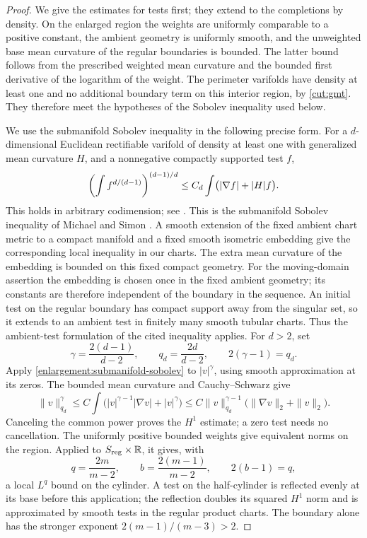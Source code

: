 \begin{proof}
We give the estimates for tests first; they extend to the completions by
density.  On the enlarged region the weights are uniformly comparable
to a positive constant, the ambient geometry is uniformly smooth, and
the unweighted base mean curvature of the regular boundaries is bounded.
The latter bound follows from the prescribed weighted mean curvature
and the bounded first derivative of the logarithm of the weight.
The perimeter varifolds have density at least one and no additional
boundary term on this interior region, by \cref{cut:gmt}.  They therefore
meet the hypotheses of the Sobolev inequality used below.

We use the submanifold Sobolev inequality in the following precise form.
For a $d$-dimensional Euclidean rectifiable varifold of density at least
one with generalized mean curvature $H$, and a nonnegative compactly
supported test $f$,
\begin{equation}\label{enlargement:submanifold-sobolev}
 \left(\int f^{d/(d-1)}\right)^{(d-1)/d}
 \le C_d\int\bigl(\lvert\nabla f\rvert+\lvert H\rvert f\bigr).
\end{equation}
This holds in arbitrary codimension; see \citet[Chapter~4, Section~5,
Theorem~5.7]{simonGMT}. This is the submanifold Sobolev inequality
of Michael and Simon \citep{michaelSimon1973}.  A smooth extension of the fixed ambient chart
metric to a compact manifold and a fixed smooth isometric embedding
\citep{nash1956} give the corresponding local inequality in our charts.
The extra mean curvature of the embedding is bounded on this fixed
compact geometry.  For the moving-domain assertion the embedding is chosen once in the
fixed ambient geometry; its constants are therefore independent of the
boundary in the sequence. An initial test on the regular boundary has compact
support away from the singular set, so it extends to an ambient test
in finitely many smooth tubular charts. Thus the ambient-test formulation
of the cited inequality applies. For $d>2$, set
\[
 \gamma=\frac{2(d-1)}{d-2},\qquad q_d=\frac{2d}{d-2},
 \qquad 2(\gamma-1)=q_d.
\]
Apply \eqref{enlargement:submanifold-sobolev} to $|v|^\gamma$, using smooth
approximation at its zeros. The bounded mean curvature and
Cauchy--Schwarz give
\[
 \|v\|_{q_d}^{\gamma}
 \le C\int\bigl(|v|^{\gamma-1}|\nabla v|+|v|^\gamma\bigr)
 \le C\|v\|_{q_d}^{\gamma-1}
                 \bigl(\|\nabla v\|_2+\|v\|_2\bigr).
\]
Canceling the common power proves the $H^1$ estimate; a zero test needs
no cancellation. The uniformly positive bounded weights give equivalent
norms on the region. Applied to
$S_{\rm reg}\times\mathbb R$, it gives, with
\[
 q=\frac{2m}{m-2},\qquad b=\frac{2(m-1)}{m-2},
 \qquad 2(b-1)=q,
\]
a local $L^q$ bound on the cylinder. A test on the half-cylinder is
reflected evenly at its base before this application; the reflection
doubles its squared $H^1$ norm and is approximated by smooth tests in
the regular product charts. The boundary alone
has the stronger exponent $2(m-1)/(m-3)>2$.


\end{proof}
